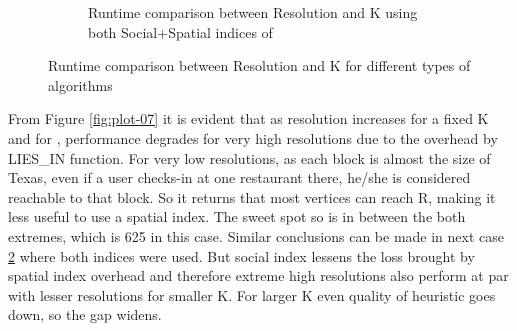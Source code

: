 \begin{figure}[t]
\begin{subfigure}[t]{0.23\textwidth}
		\caption{Runtime comparison between Resolution and K using both Social+Spatial indices of {\rrp}}
		\label{fig:plot-08}
	\end{subfigure}
	\caption{Runtime comparison between Resolution and K for different types of {\rrp} algorithms}
\end{figure}

From Figure \ref{fig:plot-07} it is evident that as resolution increases for a fixed K and for {\rrpspatial}, performance degrades for very high resolutions due to the overhead by LIES\_IN function. For very low resolutions, as each block is almost the size of Texas, even if a user checks-in at one restaurant there, he/she is considered reachable to that block. So it returns that most vertices can reach R, making it less useful to use a spatial index. The sweet spot so is in between the both extremes, which is 625 in this case. Similar conclusions can be made in next case \ref{fig:plot-08} where both indices were used. But social index lessens the loss brought by spatial index overhead and therefore extreme high resolutions also perform at par with lesser resolutions for smaller K. For larger K even quality of heuristic goes down, so the gap widens.

